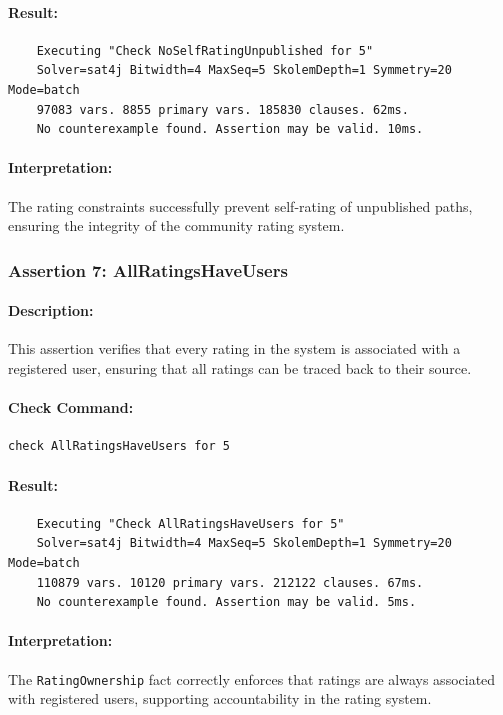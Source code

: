 \paragraph{Result:} 
\footnotesize
\begin{verbatim}
    Executing "Check NoSelfRatingUnpublished for 5"
    Solver=sat4j Bitwidth=4 MaxSeq=5 SkolemDepth=1 Symmetry=20 Mode=batch
    97083 vars. 8855 primary vars. 185830 clauses. 62ms.
    No counterexample found. Assertion may be valid. 10ms.
\end{verbatim}
\normalsize

\paragraph{Interpretation:} The rating constraints successfully prevent self-rating of unpublished paths, ensuring the integrity of the community rating system.

\subsubsection{Assertion 7: AllRatingsHaveUsers}
\paragraph{Description:} This assertion verifies that every rating in the system is associated with a registered user, ensuring that all ratings can be traced back to their source.

\paragraph{Check Command:}
\begin{verbatim}
check AllRatingsHaveUsers for 5
\end{verbatim}

\paragraph{Result:} 
\footnotesize
\begin{verbatim}
    Executing "Check AllRatingsHaveUsers for 5"
    Solver=sat4j Bitwidth=4 MaxSeq=5 SkolemDepth=1 Symmetry=20 Mode=batch
    110879 vars. 10120 primary vars. 212122 clauses. 67ms.
    No counterexample found. Assertion may be valid. 5ms.
\end{verbatim}
\normalsize

\paragraph{Interpretation:} The \texttt{RatingOwnership} fact correctly enforces that ratings are always associated with registered users, supporting accountability in the rating system.

